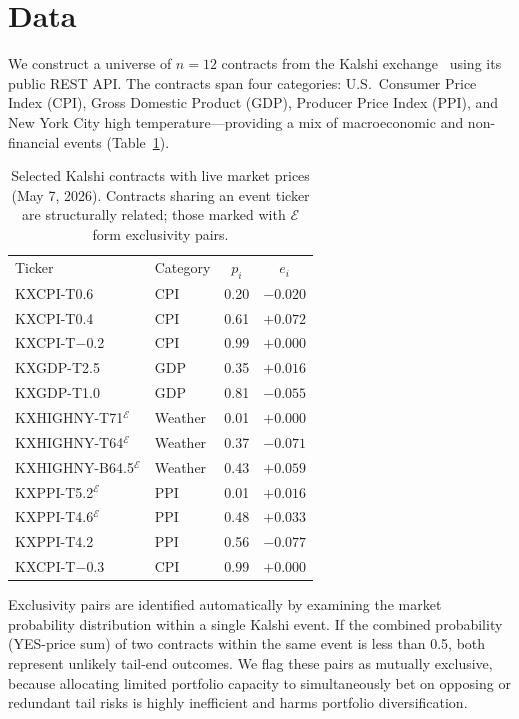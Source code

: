 \documentclass[aps, reprint, prl, twocolumn, superscriptaddress,amsmath,amssymb,noeprint]{revtex4-2}
\begin{document}
\section{Data}
We construct a universe of $n = 12$ contracts from the Kalshi exchange~\cite{kalshi}
using its public REST API.
The contracts span four categories: U.S.\ Consumer Price Index (CPI),
Gross Domestic Product (GDP), Producer Price Index (PPI), and New York City
high temperature---providing a mix of macroeconomic and non-financial
events (Table~\ref{tab:contracts}).



\begin{table}[H]
\caption{\label{tab:contracts}Selected Kalshi contracts with live market
prices (May 7, 2026).  Contracts sharing an event ticker are structurally
related; those marked with $\mathcal{E}$ form exclusivity pairs.}
\begin{ruledtabular}
\begin{tabular}{llcc}
Ticker & Category & $p_i$ & $e_i$ \\
\colrule
KXCPI-T0.6       & CPI & 0.20 & $-0.020$ \\
KXCPI-T0.4       & CPI & 0.61 & $+0.072$ \\
KXCPI-T$-$0.2    & CPI & 0.99 & $+0.000$ \\
KXGDP-T2.5       & GDP & 0.35 & $+0.016$ \\
KXGDP-T1.0       & GDP & 0.81 & $-0.055$ \\
KXHIGHNY-T71$^{\mathcal{E}}$  & Weather & 0.01 & $+0.000$ \\
KXHIGHNY-T64$^{\mathcal{E}}$  & Weather & 0.37 & $-0.071$ \\
KXHIGHNY-B64.5$^{\mathcal{E}}$& Weather & 0.43 & $+0.059$ \\
KXPPI-T5.2$^{\mathcal{E}}$    & PPI & 0.01 & $+0.016$ \\
KXPPI-T4.6$^{\mathcal{E}}$    & PPI & 0.48 & $+0.033$ \\
KXPPI-T4.2       & PPI & 0.56 & $-0.077$ \\
KXCPI-T$-$0.3    & CPI & 0.99 & $+0.000$ \\
\end{tabular}
\end{ruledtabular}
\end{table}

Exclusivity pairs are identified automatically by examining the market probability distribution within a single Kalshi event. If the combined probability (YES-price sum) of two contracts within the same event is less than 0.5, both represent unlikely tail-end outcomes. We flag these pairs as mutually exclusive, because allocating limited portfolio capacity to simultaneously bet on opposing or redundant tail risks is highly inefficient and harms portfolio diversification.
\end{document}
